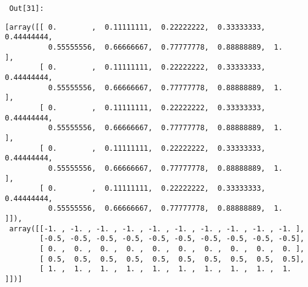 \par\vspace{1\smallerfontscale}%
    
        {\par%
        \vspace{-1\smallerfontscale}%
        \noindent%
        \begin{minipage}{\cellleftmargin}%
    \hfill%
    {\smaller%
    \tt%
    \color{nbframe-out-prompt}%
    Out[31]:}%
    \hspace{\inputpadding}%
    \hspace{0em}%
    \hspace{3pt}%
    \end{minipage}%
        }%
    \begin{addmargin}[\cellleftmargin]{0em}%
    {\smaller%
    \vspace{-1\smallerfontscale}%
    
    
    
    \begin{verbatim}
[array([[ 0.        ,  0.11111111,  0.22222222,  0.33333333,  0.44444444,
          0.55555556,  0.66666667,  0.77777778,  0.88888889,  1.        ],
        [ 0.        ,  0.11111111,  0.22222222,  0.33333333,  0.44444444,
          0.55555556,  0.66666667,  0.77777778,  0.88888889,  1.        ],
        [ 0.        ,  0.11111111,  0.22222222,  0.33333333,  0.44444444,
          0.55555556,  0.66666667,  0.77777778,  0.88888889,  1.        ],
        [ 0.        ,  0.11111111,  0.22222222,  0.33333333,  0.44444444,
          0.55555556,  0.66666667,  0.77777778,  0.88888889,  1.        ],
        [ 0.        ,  0.11111111,  0.22222222,  0.33333333,  0.44444444,
          0.55555556,  0.66666667,  0.77777778,  0.88888889,  1.        ]]),
 array([[-1. , -1. , -1. , -1. , -1. , -1. , -1. , -1. , -1. , -1. ],
        [-0.5, -0.5, -0.5, -0.5, -0.5, -0.5, -0.5, -0.5, -0.5, -0.5],
        [ 0. ,  0. ,  0. ,  0. ,  0. ,  0. ,  0. ,  0. ,  0. ,  0. ],
        [ 0.5,  0.5,  0.5,  0.5,  0.5,  0.5,  0.5,  0.5,  0.5,  0.5],
        [ 1. ,  1. ,  1. ,  1. ,  1. ,  1. ,  1. ,  1. ,  1. ,  1. ]])]
    \end{verbatim}

    
}%
    \end{addmargin}%

